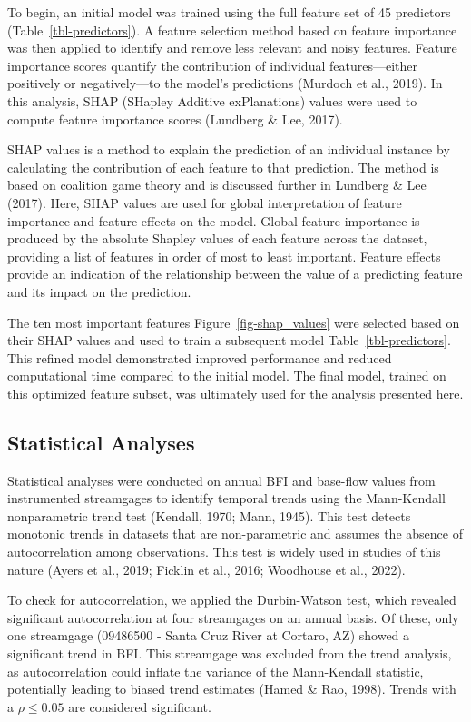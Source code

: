 \documentclass[
]{agujournal2019}
\begin{document}
To begin, an initial model was trained using the full feature set of 45
predictors (Table~\ref{tbl-predictors}). A feature selection method
based on feature importance was then applied to identify and remove less
relevant and noisy features. Feature importance scores quantify the
contribution of individual features---either positively or
negatively---to the model's predictions (Murdoch et al., 2019). In this
analysis, SHAP (SHapley Additive exPlanations) values were used to
compute feature importance scores (Lundberg \& Lee, 2017).

SHAP values is a method to explain the prediction of an individual
instance by calculating the contribution of each feature to that
prediction. The method is based on coalition game theory and is
discussed further in Lundberg \& Lee (2017). Here, SHAP values are used
for global interpretation of feature importance and feature effects on
the model. Global feature importance is produced by the absolute Shapley
values of each feature across the dataset, providing a list of features
in order of most to least important. Feature effects provide an
indication of the relationship between the value of a predicting feature
and its impact on the prediction.

The ten most important features Figure~\ref{fig-shap_values} were
selected based on their SHAP values and used to train a subsequent model
Table~\ref{tbl-predictors}. This refined model demonstrated improved
performance and reduced computational time compared to the initial
model. The final model, trained on this optimized feature subset, was
ultimately used for the analysis presented here.

\subsection{Statistical Analyses}\label{statistical-analyses}

Statistical analyses were conducted on annual BFI and base-flow values
from instrumented streamgages to identify temporal trends using the
Mann-Kendall nonparametric trend test (Kendall, 1970; Mann, 1945). This
test detects monotonic trends in datasets that are non-parametric and
assumes the absence of autocorrelation among observations. This test is
widely used in studies of this nature (Ayers et al., 2019; Ficklin et
al., 2016; Woodhouse et al., 2022).

To check for autocorrelation, we applied the Durbin-Watson test, which
revealed significant autocorrelation at four streamgages on an annual
basis. Of these, only one streamgage (09486500 - Santa Cruz River at
Cortaro, AZ) showed a significant trend in BFI. This streamgage was
excluded from the trend analysis, as autocorrelation could inflate the
variance of the Mann-Kendall statistic, potentially leading to biased
trend estimates (Hamed \& Rao, 1998). Trends with a \(\rho \le 0.05\)
are considered significant.
\end{document}
